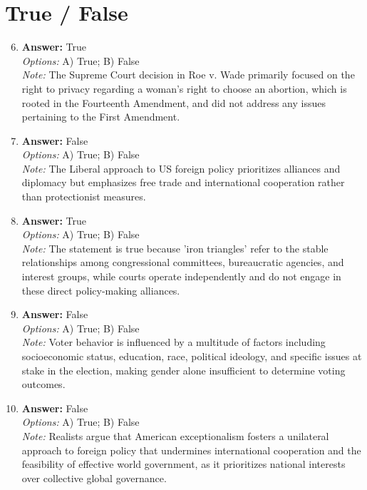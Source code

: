 \documentclass[12pt]{article}
\begin{document}
\section*{True / False}
\begin{enumerate}[label=\arabic*.]
\setcounter{enumi}{5}
\item \textbf{Answer:} True
\\ \textit{Options:} A) True; B) False
\\ \textit{Note:} The Supreme Court decision in Roe v. Wade primarily focused on the right to privacy regarding a woman's right to choose an abortion, which is rooted in the Fourteenth Amendment, and did not address any issues pertaining to the First Amendment.
\item \textbf{Answer:} False
\\ \textit{Options:} A) True; B) False
\\ \textit{Note:} The Liberal approach to US foreign policy prioritizes alliances and diplomacy but emphasizes free trade and international cooperation rather than protectionist measures.
\item \textbf{Answer:} True
\\ \textit{Options:} A) True; B) False
\\ \textit{Note:} The statement is true because 'iron triangles' refer to the stable relationships among congressional committees, bureaucratic agencies, and interest groups, while courts operate independently and do not engage in these direct policy-making alliances.
\item \textbf{Answer:} False
\\ \textit{Options:} A) True; B) False
\\ \textit{Note:} Voter behavior is influenced by a multitude of factors including socioeconomic status, education, race, political ideology, and specific issues at stake in the election, making gender alone insufficient to determine voting outcomes.
\item \textbf{Answer:} False
\\ \textit{Options:} A) True; B) False
\\ \textit{Note:} Realists argue that American exceptionalism fosters a unilateral approach to foreign policy that undermines international cooperation and the feasibility of effective world government, as it prioritizes national interests over collective global governance.
\end{enumerate}
\end{document}
